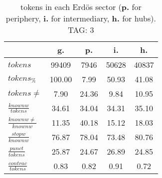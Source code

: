 \begin{table}[h!]
\begin{center}
\begin{tabular}{| l || c | c | c | c |}\hline
 & {\bf g.} & {\bf p.} & {\bf i.} & {\bf h.} \\\hline\hline
$tokens$ & 99409  & 7946  & 50628  & 40837 \\
$tokens_{\%}$ & 100.00  & 7.99  & 50.93  & 41.08 \\
$tokens \neq$ & 7.90  & 24.36  & 9.84  & 10.95 \\\hline
$\frac{knownw}{tokens}$ & 34.61  & 34.04  & 34.31  & 35.10 \\
$\frac{knownw \neq}{knownw}$ & 11.35  & 40.18  & 15.12  & 18.03 \\\hline
$\frac{stopw}{knownw}$ & 76.87  & 78.04  & 73.48  & 80.76 \\
$\frac{punct}{tokens}$ & 25.87  & 24.67  & 26.89  & 24.85 \\
$\frac{contrac}{tokens}$ & 0.83  & 0.82  & 0.91  & 0.72 \\\hline
\end{tabular}
\caption{tokens in each Erd\"os sector ({{\bf p.}} for periphery, {{\bf i.}} for intermediary, 
    {{\bf h.}} for hubs). TAG: 3}
\end{center}
\end{table}